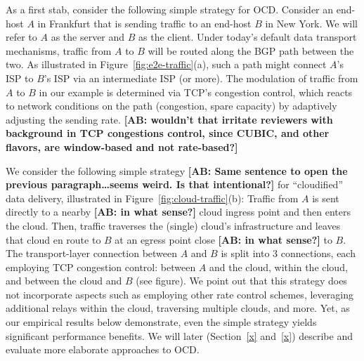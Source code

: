 \documentclass[10pt,sigconf]{acmart}
\newcommand{\mycomm}[3]{{\color{#2} \textbf{[#1: #3]}}}
\newcommand{\mycomm}[3]{}
\newcommand{\AB}[1]{\mycomm{AB}{orange}{#1}}
\begin{document}

As a first stab, consider the following simple strategy for OCD. Consider an
end-host $A$ in Frankfurt that is sending traffic to an end-host $B$ in New
York. We will refer to $A$ as the server and $B$ as the client. Under today's
default data transport mechanisms, traffic from $A$ to $B$ will be routed along
the BGP path between the two. As illustrated in Figure~\ref{fig:e2e-traffic}(a),
such a path might connect $A$'s ISP to $B$'s ISP via an intermediate ISP (or
more). The modulation of traffic from $A$ to $B$ in our example is determined
via TCP's congestion control, which reacts to network conditions on the path
(congestion, spare capacity) by adaptively adjusting the sending rate.\AB{wouldn't that irritate
reviewers with background in TCP congestions control, since CUBIC, and other
flavors, are window-based and not rate-based?}        

We consider the following simple strategy\AB{Same sentence to open the previous
paragraph\ldots seems weird. Is that intentional?} for ``cloudified'' data delivery,
illustrated in Figure~\ref{fig:cloud-traffic}(b): Traffic from $A$ is sent
directly to a nearby\AB{in what sense?} cloud ingress point and then enters the
cloud. Then, traffic traverses the (single) cloud's infrastructure and leaves that cloud en
route to $B$ at an egress point close\AB{in what sense?} to $B$. The
transport-layer connection between $A$ and $B$ is split into $3$ connections, each employing TCP congestion
control: between $A$ and the cloud, within the cloud, and between the cloud and
$B$ (see figure). We point out that this strategy does not incorporate aspects
such as employing other rate control schemes, leveraging additional relays
within the cloud, traversing multiple clouds, and more. Yet, as our empirical
results below demonstrate, even the simple strategy yields significant
performance benefits. We will later (Section~\ref{x} and~\ref{x}) describe and
evaluate more elaborate approaches to OCD.              
\end{document}

